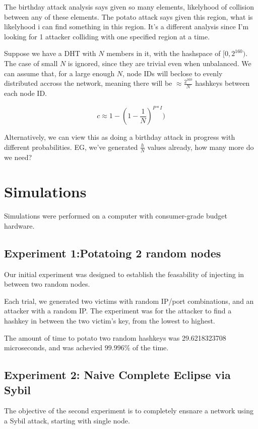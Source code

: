 \documentclass[10pt,a4paper]{article}
\begin{document}
The birthday attack analysis says given so many elements, likelyhood of collision between any of these elements.
The potato attack says given this region, what is likelyhood i can find something in this region.  
It's a different analysis since I'm looking for 1 attacker colliding with one specified region at a time.

Suppose we have a DHT with $N$ members in it, with the hashspace of $[0,2^{160})$.
The case of small $N$ is ignored, since they are trivial even when unbalanced.
We can assume that, for a large enough $N$, node IDs will beclose to evenly distributed accross the network, meaning there will be $\approx \frac{2^{160}}{N}$ hashkeys between each node ID.

$$c \approx  1 - (1 -\frac{1}{N})^{P*I})  $$

Alternatively, we can view this as doing a birthday attack in progress with different probabilities.
EG, we've generated $\frac{h}{N}$ values already, how many more do we need?


\section{Simulations}
Simulations were performed on a computer with consumer-grade budget hardware. 


\subsection{Experiment 1:Potatoing 2 random nodes}
Our initial experiment was designed to establish the feasability of injecting in between two random nodes.

Each trial, we generated two victims with random IP/port combinations, and an attacker with a random IP.
The experiment was for the attacker to find a hashkey in between the two victim's key, from the lowest to highest.

The amount of time to potato two random hashkeys was 29.6218323708 microseconds, and was achevied $ 99.996\%$ of the time.



\subsection{Experiment 2:  Naive Complete Eclipse via Sybil}
The objective of the second experiment is to completely ensnare a network using a Sybil attack, starting with single node.





\end{document}
